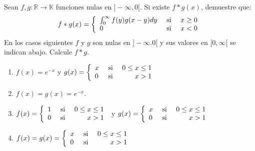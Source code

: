 \documentclass[12pt]{report}
\newcounter{it}
\theoremstyle{largebreak}
\newcommand\cf[3]{\ensuremath{#1:#2\rightarrow#3}}
\begin{document}
    \begin{excer}
        Sean $\cf{f,g}{\mathbb{R}}{\mathbb{K}}$ funciones nulas en $]-\infty,0[$. Si existe $f*g(x)$, demuestre que:
        \begin{equation*}
            f*g(x)=\left\{
                \begin{array}{lcr}
                    \int_{0}^\infty f(y)g(x-y)dy & \textup{ si } & x\geq0\\
                    0 & \textup{ si }&x<0\\
                \end{array}
            \right.
        \end{equation*}
        En los casos siguientes $f$ y $g$ son nulas en $]-\infty.0[$ y sus valores en $[0,\infty[$ se indican abajo. Calcule $f*g$.
        \begin{enumerate}
            \item $f(x)=e^{-x}$ y $g(x)=\left\{
                    \begin{array}{lcr}
                        x & \textup{ si } & 0\leq x\leq 1 \\
                        0 & \textup{ si }&x>1\\
                    \end{array}
                \right.$
            \item $f(x)=g(x)=e^{-x}$.
            \item $f(x)=\left\{
                \begin{array}{lcr}
                    1 & \textup{ si } & 0\leq x\leq 1 \\
                    0 & \textup{ si }&x>1\\
                \end{array}
            \right.$ y $g(x)=\left\{
                \begin{array}{lcr}
                    x & \textup{ si } & 0\leq x\leq 1 \\
                    0 & \textup{ si }&x>1\\
                \end{array}
            \right.$
            \item $f(x)=g(x)=\left\{
                \begin{array}{lcr}
                    x & \textup{ si } & 0\leq x\leq 1 \\
                    0 & \textup{ si }&x>1\\
                \end{array}
            \right.$
        \end{enumerate}
    \end{excer}
\end{document}
